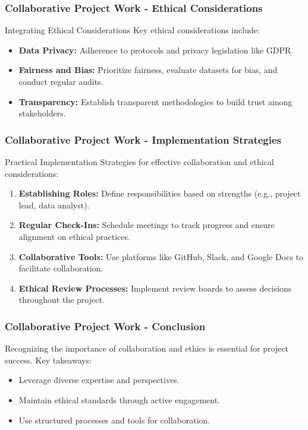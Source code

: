 \documentclass[aspectratio=169]{beamer}
\begin{document}
\begin{frame}[fragile]
    \frametitle{Collaborative Project Work - Ethical Considerations}
    \begin{block}{Integrating Ethical Considerations}
        Key ethical considerations include:
        \begin{itemize}
            \item \textbf{Data Privacy:} Adherence to protocols and privacy legislation like GDPR.
            \item \textbf{Fairness and Bias:} Prioritize fairness, evaluate datasets for bias, and conduct regular audits.
            \item \textbf{Transparency:} Establish transparent methodologies to build trust among stakeholders.
        \end{itemize}
    \end{block}
\end{frame}

\begin{frame}[fragile]
    \frametitle{Collaborative Project Work - Implementation Strategies}
    \begin{block}{Practical Implementation}
        Strategies for effective collaboration and ethical considerations:
        \begin{enumerate}
            \item \textbf{Establishing Roles:} Define responsibilities based on strengths (e.g., project lead, data analyst).
            \item \textbf{Regular Check-Ins:} Schedule meetings to track progress and ensure alignment on ethical practices.
            \item \textbf{Collaborative Tools:} Use platforms like GitHub, Slack, and Google Docs to facilitate collaboration.
            \item \textbf{Ethical Review Processes:} Implement review boards to assess decisions throughout the project.
        \end{enumerate}
    \end{block}
\end{frame}

\begin{frame}[fragile]
    \frametitle{Collaborative Project Work - Conclusion}
    Recognizing the importance of collaboration and ethics is essential for project success. Key takeaways:
    \begin{itemize}
        \item Leverage diverse expertise and perspectives.
        \item Maintain ethical standards through active engagement.
        \item Use structured processes and tools for collaboration.
    \end{itemize}
\end{frame}
\end{document}
